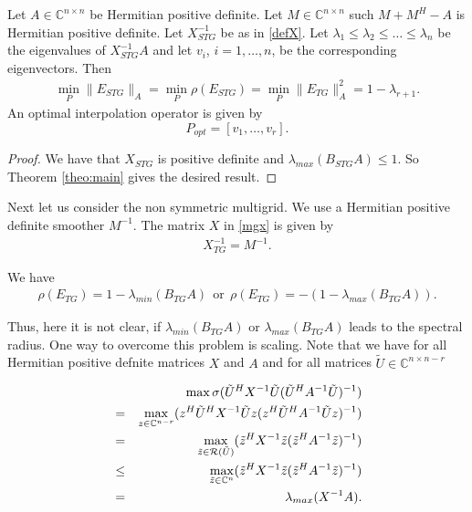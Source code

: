 \documentclass[final]{siamltex}
\newcommand{\innCnmr}{\in\mathbb{C}^{n-r}}
\newcommand{\beqo}{\begin{eqnarray*}}
\newcommand{\beq}{\begin{eqnarray}}
\newcommand{\eeqo}{\end{eqnarray*}}
\newcommand{\eeq}{\end{eqnarray}}
\numberwithin{equation}{section}
\newcommand{\ran} {{\cal R}}
\newcommand{\bCn}{\mathbb{C}^n}
\newcommand{\Cnnr}{\mathbb{C}^{n \times n-r}}
\newcommand{\inCnn}{\in \mathbb{C}^{n \times n}}
\begin{document}
\begin{corollary} \label{coro:one}
Let  $A\inCnn$  be Hermitian positive definite. Let $ M \inCnn$ such $M + M^H - A$ is Hermitian positive definite. 
Let $X_{STG}^{-1}$  be as in \eqref{defX}.  
 Let $
\lambda_1 \leq \lambda_2 \leq \ldots \leq  \lambda_n $
be the  eigenvalues of $X_{STG}^{-1}A$  and let $v_i$, $i = 1, \ldots, n$, be the corresponding eigenvectors. Then 
\beq
\min_{P} \|E_{STG}\|_A = \min_{P}\rho(E_{STG}) =  \min_{P}\|E_{TG}\|_A^2 = 1 - \lambda_{r+1}.
\eeq
An optimal interpolation operator is given by 
\[
P_{opt} = [v_{1}, \ldots , v_r].
\]
\end{corollary}
\begin{proof}
We have  that $X_{STG}$ is positive definite and $\lambda_{max}(B_{STG}A) \leq 1$. So Theorem \ref{theo:main} gives the desired result. 
\end{proof}

Next  let us consider  the non symmetric  multigrid. 
We use a Hermitian positive  definite smoother $M^{-1}$. The matrix $X$ in \eqref{mgx} is given by 
\beq \label{defXtg}
X^{-1}_{TG} = M^{-1}.
\eeq

We have
\beqo
\rho(E_{TG}) = 1 - \lambda_{min}(B_{TG}A)
\ \  \mbox{or} \ \ 
\rho(E_{TG}) = -(1 - \lambda_{max}(B_{TG}A)).
\eeqo

Thus, here it is not clear, if $\lambda_{min}(B_{TG}A)$ or $\lambda_{max}(B_{TG}A)$  leads to the spectral radius. 
One way to overcome  this problem is scaling. Note that we  have for all Hermitian positive defnite matrices $X$ and $A$ and for all matrices $\tilde U \in \Cnnr$


\beqo
& &  \max \sigma(\tilde U^HX^{-1}\tilde U (\tilde U^HA^{-1}\tilde U)^{-1})\\
& = &  \max_{z \innCnmr} (z^H\tilde U^HX^{-1}\tilde Uz (z^H\tilde U^HA^{-1}\tilde Uz)^{-1})\\
& = &  \max_{\tilde z \in {\ran (\tilde U)} } (\tilde z^HX^{-1}\tilde z (\tilde z^HA^{-1}\tilde z)^{-1})\\
& \leq & \max_{\tilde z \in \bCn } (\tilde z^HX^{-1}\tilde z (\tilde z^HA^{-1}\tilde z)^{-1})\\
& = & \lambda_{max}(X^{-1}A).
\eeqo
\end{document}
